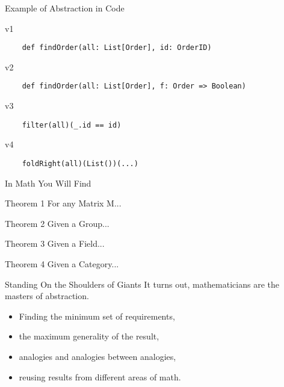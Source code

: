 \documentclass{beamer}
\begin{document}
\begin{framej}
\begin{frame}[fragile]{Example of Abstraction in Code}
  \begin{block}{v1}
  \begin{lstlisting}
    def findOrder(all: List[Order], id: OrderID)
  \end{lstlisting}
  \end{block}

  \begin{block}{v2}
  \begin{lstlisting}
    def findOrder(all: List[Order], f: Order => Boolean)
  \end{lstlisting}
  \end{block}

  \begin{block}{v3}
  \begin{lstlisting}
    filter(all)(_.id == id)
  \end{lstlisting}
  \end{block}

  \begin{block}{v4}
  \begin{lstlisting}
    foldRight(all)(List())(...)
  \end{lstlisting}
  \end{block}

\end{frame}

\begin{frame}{In Math You Will Find}
  \begin{block}{Theorem 1}
    For any Matrix M...
  \end{block}

  \begin{block}{Theorem 2}
    Given a Group...
  \end{block}

  \begin{block}{Theorem 3}
    Given a Field...
  \end{block}

  \begin{block}{Theorem 4}
    Given a Category...
  \end{block}

\end{frame}


\begin{frame}{Standing On the Shoulders of Giants}
  It turns out, mathematicians are the \alert{masters of abstraction.}
  \begin{itemize}
  \item Finding the minimum set of requirements,
  \item the maximum generality of the result,
  \item analogies and analogies between analogies,
  \item reusing results from different areas of math.
  \end{itemize}


\end{frame}
\end{framej}
\end{document}
